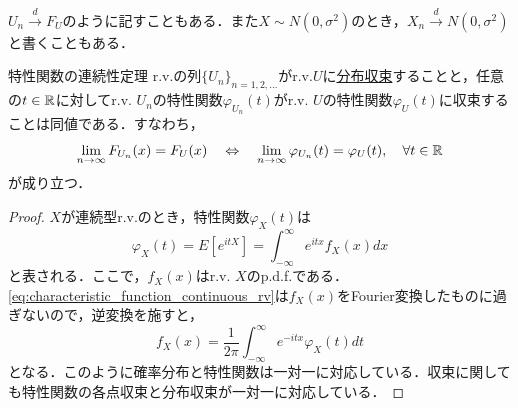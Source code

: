 \documentclass[main.tex]{subfiles}
\begin{document}
\begin{myattention}{}
  $U_n \xrightarrow{d} F_U$のように記すこともある．また$X \sim N(0,\sigma^2)$のとき，$X_n \xrightarrow{d} N(0,\sigma^2)$と書くこともある．
\end{myattention}

\begin{mytheorem}{特性関数の連続性定理}
\label{thm:continuity_theorem_of_characteristic_functions} %
  r.v.の列$\{U_n\}_{n=1,2,\dots}$がr.v.$U$に\hyperref[def:convergence_in_distribution]{分布収束}することと，任意の$t \in \mathbb{R}$に対してr.v. $U_n$の特性関数$\varphi_{U_n}(t)$がr.v. $U$の特性関数$\varphi_U(t)$に収束することは同値である．すなわち，
  \begin{equation}
    \lim_{n \to \infty} F_{U_n}(x) = F_U(x) \quad \Leftrightarrow \quad \lim_{n \to \infty} \varphi_{U_n}(t) = \varphi_U(t), \quad \forall t \in \mathbb{R}
  \end{equation}
  が成り立つ．
\end{mytheorem}
\begin{proof}
  $X$が連続型r.v.のとき，特性関数$\varphi_X(t)$は
  \begin{equation}
    \varphi_X(t) = E[e^{itX}] = \int_{-\infty}^{\infty} e^{itx} f_X(x) dx
    \label{eq:characteristic_function_continuous_rv}
  \end{equation}
  と表される．ここで，$f_X(x)$はr.v. $X$のp.d.f.である．\eqref{eq:characteristic_function_continuous_rv}は$f_X(x)$をFourier変換したものに過ぎないので，逆変換を施すと，
  \begin{equation}
    f_X(x) = \frac{1}{2\pi} \int_{-\infty}^{\infty} e^{-itx} \varphi_X(t) dt
    \label{eq:inverse_characteristic_function_continuous_rv}
  \end{equation}
  となる．このように確率分布と特性関数は一対一に対応している．収束に関しても特性関数の各点収束と分布収束が一対一に対応している．
\end{proof}
\end{document}
